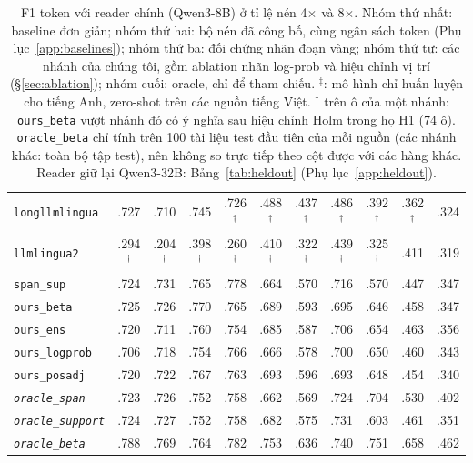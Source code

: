 \documentclass[11pt]{article}
\newcommand{\arm}[1]{\texttt{#1}}
\begin{document}
\begin{table}[t]
\begin{tabular}{l cc cc cc cc cc}
\arm{longllmlingua} & .727 & .710 & .745 & .726$^\dagger$ & .488$^\dagger$ & .437$^\dagger$ & .486$^\dagger$ & .392$^\dagger$ & .362$^\dagger$ & .324 \\
\arm{llmlingua2} & .294$^\dagger$ & .204$^\dagger$ & .398$^\dagger$ & .260$^\dagger$ & .410$^\dagger$ & .322$^\dagger$ & .439$^\dagger$ & .325$^\dagger$ & .411 & .319 \\
\midrule
\arm{span\_sup} & .724 & .731 & .765 & .778 & .664 & .570 & .716 & .570 & .447 & .347 \\
\midrule
\arm{ours\_beta} & .725 & .726 & .770 & .765 & .689 & .593 & .695 & .646 & .458 & .347 \\
\arm{ours\_ens} & .720 & .711 & .760 & .754 & .685 & .587 & .706 & .654 & .463 & .356 \\
\arm{ours\_logprob} & .706 & .718 & .754 & .766 & .666 & .578 & .700 & .650 & .460 & .343 \\
\arm{ours\_posadj} & .720 & .722 & .767 & .763 & .693 & .596 & .693 & .648 & .454 & .340 \\
\midrule
\textit{\arm{oracle\_span}} & .723 & .726 & .752 & .758 & .662 & .569 & .724 & .704 & .530 & .402 \\
\textit{\arm{oracle\_support}} & .724 & .727 & .752 & .758 & .682 & .575 & .731 & .603 & .461 & .351 \\
\textit{\arm{oracle\_beta}} & .788 & .769 & .764 & .782 & .753 & .636 & .740 & .751 & .658 & .462 \\
\bottomrule
\end{tabular}
\caption{F1 token với reader chính (Qwen3-8B) ở tỉ lệ nén 4$\times$ và 8$\times$.
Nhóm thứ nhất: baseline đơn giản; nhóm thứ hai: bộ nén đã công bố, cùng ngân sách token
(Phụ lục~\ref{app:baselines}); nhóm thứ ba: đối chứng nhãn đoạn vàng; nhóm thứ tư: các nhánh của chúng
tôi, gồm ablation nhãn log-prob và hiệu chỉnh vị trí (\S\ref{sec:ablation}); nhóm cuối: oracle, chỉ để
tham chiếu. $^\ddagger$: mô hình chỉ
huấn luyện cho tiếng Anh, zero-shot trên các nguồn tiếng Việt. $^\dagger$ trên ô của một nhánh:
\arm{ours\_beta} vượt nhánh đó có ý nghĩa sau hiệu chỉnh Holm trong họ H1 (74 ô).
\arm{oracle\_beta} chỉ tính trên 100 tài liệu
test đầu tiên của mỗi nguồn (các nhánh khác: toàn bộ tập test), nên không so trực tiếp theo cột được với
các hàng khác. Reader giữ lại Qwen3-32B: Bảng~\ref{tab:heldout} (Phụ lục~\ref{app:heldout}).}
\label{tab:main}
\end{table}
\end{document}
